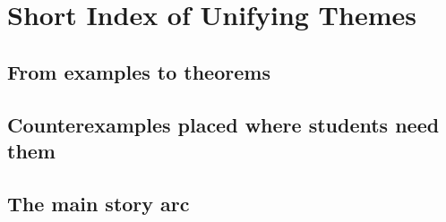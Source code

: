 
\chapter*{Short Index of Unifying Themes}

\section*{From examples to theorems}

\section*{Counterexamples placed where students need them}

\section*{The main story arc}
